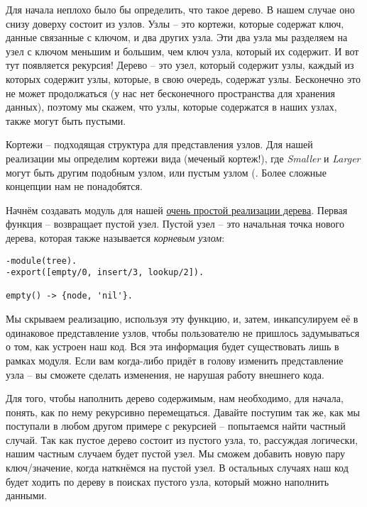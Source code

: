 Для начала неплохо было бы определить, что такое дерево.
В нашем случае оно снизу доверху состоит из узлов.
Узлы \--- это кортежи, которые содержат ключ, данные связанные с ключом, и два других узла.
Эти два узла мы разделяем на узел с ключом меньшим и большим, чем ключ узла, который их содержит.
И вот тут появляется рекурсия!
Дерево \--- это узел, который содержит узлы, каждый из которых содержит узлы, которые, в свою очередь, содержат узлы.
Бесконечно это не может продолжаться (у нас нет бесконечного пространства для хранения данных), поэтому мы скажем, что узлы, которые содержатся в наших узлах, также могут быть пустыми.

Кортежи \--- подходящая структура для представления узлов.
Для нашей реализации мы определим кортежи вида  (меченый кортеж!), где \emph{Smaller} и \emph{Larger} могут быть другим подобным узлом, или пустым узлом (.
Более сложные концепции нам не понадобятся.

Начнём создавать модуль для нашей \href{http://learnyousomeerlang.com/static/erlang/tree.erl}{очень простой реализации дерева}.
Первая функция  \--- возвращает пустой узел.
Пустой узел \--- это начальная точка нового дерева, которая также называется \emph{корневым узлом}:
\begin{lstlisting}[style=erlang]
-module(tree).
-export([empty/0, insert/3, lookup/2]).
 
empty() -> {node, 'nil'}.
\end{lstlisting}

Мы скрываем реализацию, используя эту функцию, и, затем, инкапсулируем её в одинаковое представление узлов, чтобы пользователю не пришлось задумываться о том, как устроен наш код.
Вся эта информация будет существовать лишь в рамках модуля.
Если вам когда\--либо придёт в голову изменить представление узла \--- вы сможете сделать изменения, не нарушая работу внешнего кода.

Для того, чтобы наполнить дерево содержимым, нам необходимо, для начала, понять, как по нему рекурсивно перемещаться.
Давайте поступим так же, как мы поступали в любом другом примере с рекурсией \--- попытаемся найти частный случай.
Так как пустое дерево состоит из пустого узла, то, рассуждая логически, нашим частным случаем будет пустой узел.
Мы сможем добавить новую пару ключ/значение, когда наткнёмся на пустой узел.
В остальных случаях наш код будет ходить по дереву в поисках пустого узла, который можно наполнить данными.

